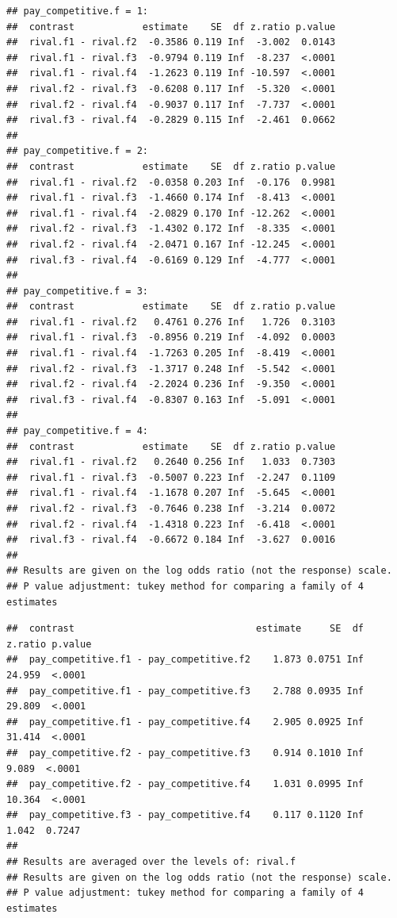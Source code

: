 \documentclass[
]{article}
\begin{document}
\begin{verbatim}
## pay_competitive.f = 1:
##  contrast            estimate    SE  df z.ratio p.value
##  rival.f1 - rival.f2  -0.3586 0.119 Inf  -3.002  0.0143
##  rival.f1 - rival.f3  -0.9794 0.119 Inf  -8.237  <.0001
##  rival.f1 - rival.f4  -1.2623 0.119 Inf -10.597  <.0001
##  rival.f2 - rival.f3  -0.6208 0.117 Inf  -5.320  <.0001
##  rival.f2 - rival.f4  -0.9037 0.117 Inf  -7.737  <.0001
##  rival.f3 - rival.f4  -0.2829 0.115 Inf  -2.461  0.0662
## 
## pay_competitive.f = 2:
##  contrast            estimate    SE  df z.ratio p.value
##  rival.f1 - rival.f2  -0.0358 0.203 Inf  -0.176  0.9981
##  rival.f1 - rival.f3  -1.4660 0.174 Inf  -8.413  <.0001
##  rival.f1 - rival.f4  -2.0829 0.170 Inf -12.262  <.0001
##  rival.f2 - rival.f3  -1.4302 0.172 Inf  -8.335  <.0001
##  rival.f2 - rival.f4  -2.0471 0.167 Inf -12.245  <.0001
##  rival.f3 - rival.f4  -0.6169 0.129 Inf  -4.777  <.0001
## 
## pay_competitive.f = 3:
##  contrast            estimate    SE  df z.ratio p.value
##  rival.f1 - rival.f2   0.4761 0.276 Inf   1.726  0.3103
##  rival.f1 - rival.f3  -0.8956 0.219 Inf  -4.092  0.0003
##  rival.f1 - rival.f4  -1.7263 0.205 Inf  -8.419  <.0001
##  rival.f2 - rival.f3  -1.3717 0.248 Inf  -5.542  <.0001
##  rival.f2 - rival.f4  -2.2024 0.236 Inf  -9.350  <.0001
##  rival.f3 - rival.f4  -0.8307 0.163 Inf  -5.091  <.0001
## 
## pay_competitive.f = 4:
##  contrast            estimate    SE  df z.ratio p.value
##  rival.f1 - rival.f2   0.2640 0.256 Inf   1.033  0.7303
##  rival.f1 - rival.f3  -0.5007 0.223 Inf  -2.247  0.1109
##  rival.f1 - rival.f4  -1.1678 0.207 Inf  -5.645  <.0001
##  rival.f2 - rival.f3  -0.7646 0.238 Inf  -3.214  0.0072
##  rival.f2 - rival.f4  -1.4318 0.223 Inf  -6.418  <.0001
##  rival.f3 - rival.f4  -0.6672 0.184 Inf  -3.627  0.0016
## 
## Results are given on the log odds ratio (not the response) scale. 
## P value adjustment: tukey method for comparing a family of 4 estimates
\end{verbatim}

\begin{verbatim}
##  contrast                                estimate     SE  df z.ratio p.value
##  pay_competitive.f1 - pay_competitive.f2    1.873 0.0751 Inf  24.959  <.0001
##  pay_competitive.f1 - pay_competitive.f3    2.788 0.0935 Inf  29.809  <.0001
##  pay_competitive.f1 - pay_competitive.f4    2.905 0.0925 Inf  31.414  <.0001
##  pay_competitive.f2 - pay_competitive.f3    0.914 0.1010 Inf   9.089  <.0001
##  pay_competitive.f2 - pay_competitive.f4    1.031 0.0995 Inf  10.364  <.0001
##  pay_competitive.f3 - pay_competitive.f4    0.117 0.1120 Inf   1.042  0.7247
## 
## Results are averaged over the levels of: rival.f 
## Results are given on the log odds ratio (not the response) scale. 
## P value adjustment: tukey method for comparing a family of 4 estimates
\end{verbatim}
\end{document}

